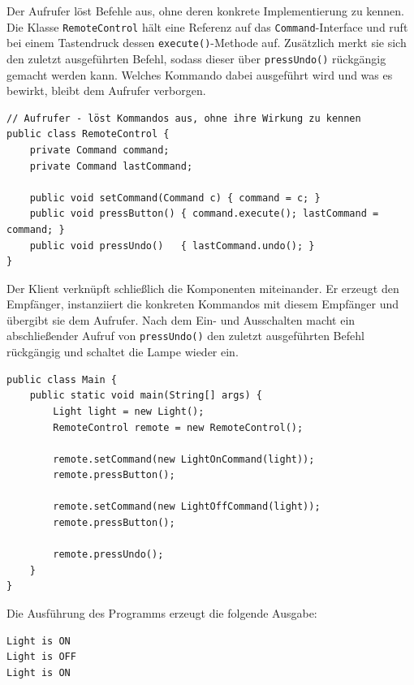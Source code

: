 \documentclass[12pt,a4paper]{article}
\begin{document}
    Der Aufrufer löst Befehle aus, ohne deren konkrete Implementierung zu kennen. Die Klasse
    \texttt{RemoteControl} hält eine Referenz auf das \texttt{Command}-Interface und ruft bei einem Tastendruck
    dessen \texttt{execute()}-Methode auf. Zusätzlich merkt sie sich den zuletzt ausgeführten Befehl, sodass
    dieser über \texttt{pressUndo()} rückgängig gemacht werden kann. Welches Kommando dabei ausgeführt wird und
    was es bewirkt, bleibt dem Aufrufer verborgen.

    \begin{lstlisting}[caption={Der Aufrufer \texttt{RemoteControl}}, label={lst:invoker}]
// Aufrufer - löst Kommandos aus, ohne ihre Wirkung zu kennen
public class RemoteControl {
    private Command command;
    private Command lastCommand;

    public void setCommand(Command c) { command = c; }
    public void pressButton() { command.execute(); lastCommand = command; }
    public void pressUndo()   { lastCommand.undo(); }
}
    \end{lstlisting}

    Der Klient verknüpft schließlich die Komponenten miteinander. Er erzeugt den Empfänger, instanziiert
    die konkreten Kommandos mit diesem Empfänger und übergibt sie dem Aufrufer. Nach dem Ein- und Ausschalten
    macht ein abschließender Aufruf von \texttt{pressUndo()} den zuletzt ausgeführten Befehl rückgängig und
    schaltet die Lampe wieder ein.

    \begin{lstlisting}[caption={Der Klient \texttt{Main}}, label={lst:client}]
public class Main {
    public static void main(String[] args) {
        Light light = new Light();
        RemoteControl remote = new RemoteControl();

        remote.setCommand(new LightOnCommand(light));
        remote.pressButton();

        remote.setCommand(new LightOffCommand(light));
        remote.pressButton();

        remote.pressUndo();
    }
}
    \end{lstlisting}

    Die Ausführung des Programms erzeugt die folgende Ausgabe:

    \begin{lstlisting}[language={}, caption={Konsolenausgabe des Beispiels}, label={lst:output}]
Light is ON
Light is OFF
Light is ON
    \end{lstlisting}
\end{document}

